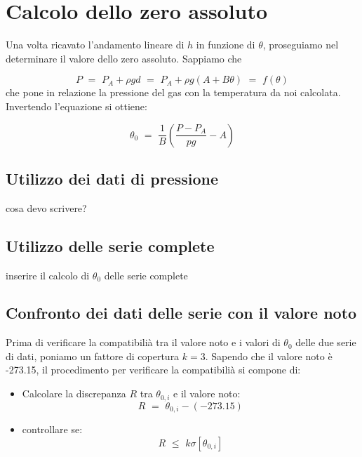 \section{Calcolo dello zero assoluto}

Una volta ricavato l'andamento lineare di $h$ in funzione di $\theta$, proseguiamo nel determinare il valore dello zero assoluto. Sappiamo che 

\begin{equation}
	P \,\, = \,\, P_A + \rho g d \,\, = \,\, P_A + \rho g (A + B \theta) \,\, = \,\, f(\theta)
\end{equation}
%
che pone in relazione la pressione del gas con la temperatura da noi calcolata. Invertendo l'equazione si ottiene:

\begin{equation}
	\theta_0 \,\, = \,\, \frac{1}{B} \left( \frac{P - P_A}{pg} - A \right)
\end{equation}

\subsection{Utilizzo dei dati di pressione}
cosa devo scrivere?

\subsection{Utilizzo delle serie complete}

inserire il calcolo di $\theta_0$ delle serie complete

\subsection{Confronto dei dati delle serie con il valore noto}
\label{confronto}
Prima di verificare la compatibilià tra il valore noto e i valori di $\theta_0$ delle due serie di dati, poniamo un fattore di copertura $k=3$. Sapendo che il valore noto è -273.15, il procedimento per verificare la compatibilià si compone di:

\begin{itemize}
\item Calcolare la discrepanza $R$ tra $\theta_{0,i}$ e il valore noto:
\begin{equation*}
	R \,\, = \,\, \theta_{0,i} - (-273.15)
\end{equation*}
\item controllare se:
\begin{equation*}
	R \,\, \leq \,\, k \sigma[\theta_{0,i}]
\end{equation*}
\end{itemize}

